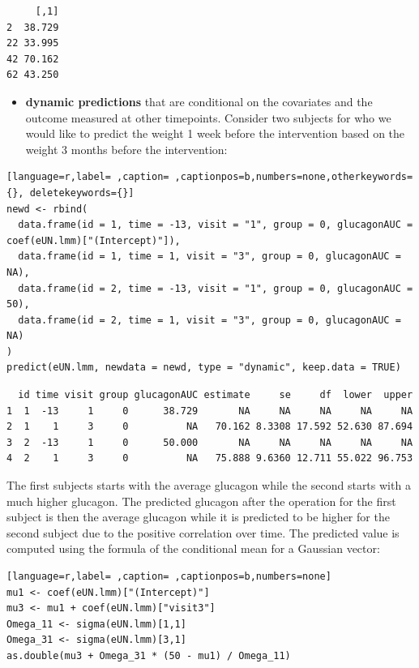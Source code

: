 \documentclass[12pt]{article}
\begin{document}
\begin{verbatim}
     [,1]
2  38.729
22 33.995
42 70.162
62 43.250
\end{verbatim}


\clearpage

\begin{itemize}
\item \textbf{dynamic predictions} that are conditional on the covariates and the
outcome measured at other timepoints. Consider two subjects for who
we would like to predict the weight 1 week before the intervention
based on the weight 3 months before the intervention:
\end{itemize}

\begin{lstlisting}[language=r,label= ,caption= ,captionpos=b,numbers=none,otherkeywords={}, deletekeywords={}]
newd <- rbind(
  data.frame(id = 1, time = -13, visit = "1", group = 0, glucagonAUC = coef(eUN.lmm)["(Intercept)"]),
  data.frame(id = 1, time = 1, visit = "3", group = 0, glucagonAUC = NA),
  data.frame(id = 2, time = -13, visit = "1", group = 0, glucagonAUC = 50),
  data.frame(id = 2, time = 1, visit = "3", group = 0, glucagonAUC = NA)
)
predict(eUN.lmm, newdata = newd, type = "dynamic", keep.data = TRUE)
\end{lstlisting}

\begin{verbatim}
  id time visit group glucagonAUC estimate     se     df  lower  upper
1  1  -13     1     0      38.729       NA     NA     NA     NA     NA
2  1    1     3     0          NA   70.162 8.3308 17.592 52.630 87.694
3  2  -13     1     0      50.000       NA     NA     NA     NA     NA
4  2    1     3     0          NA   75.888 9.6360 12.711 55.022 96.753
\end{verbatim}


The first subjects starts with the average glucagon while the second
  starts with a much higher glucagon. The predicted glucagon after the
  operation for the first subject is then the average glucagon while
  it is predicted to be higher for the second subject due to the
  positive correlation over time. The predicted value is computed
  using the formula of the conditional mean for a Gaussian vector:
\begin{lstlisting}[language=r,label= ,caption= ,captionpos=b,numbers=none]
mu1 <- coef(eUN.lmm)["(Intercept)"]
mu3 <- mu1 + coef(eUN.lmm)["visit3"]
Omega_11 <- sigma(eUN.lmm)[1,1]
Omega_31 <- sigma(eUN.lmm)[3,1]
as.double(mu3 + Omega_31 * (50 - mu1) / Omega_11)
\end{lstlisting}
\end{document}
